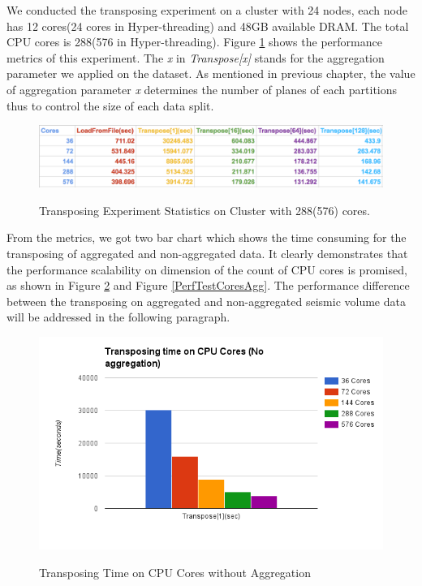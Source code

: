 We conducted the transposing experiment on a cluster with 24 nodes, each node has 12 cores(24 cores in Hyper-threading) and 48GB available DRAM. The total CPU cores is 288(576 in Hyper-threading). Figure \ref{TestStat} shows the performance metrics of this experiment. The \emph{x} in \emph{Transpose[x]} stands for the aggregation parameter we applied on the dataset. As mentioned in previous chapter, the value of aggregation parameter \emph{x} determines the number of planes of each partitions thus to control the size of each data split. 

\begin{figure}[h]
\centering
\includegraphics[scale=0.6]{figures/TestStat.png}\\
\caption{Transposing Experiment Statistics on Cluster with 288(576) cores.}\label{TestStat}
\end{figure}

From the metrics, we got two bar chart which shows the time consuming for the transposing of aggregated and non-aggregated data. It clearly demonstrates that the performance scalability on dimension of the count of CPU cores is promised, as shown in Figure \ref{PerfTestCoresNoAgg} and  Figure \ref{PerfTestCoresAgg}.  The performance difference between the transposing on aggregated and non-aggregated seismic volume data will be addressed in the following paragraph.

\begin{figure}[ht]
\centering
\includegraphics[scale=0.7]{figures/PerfTestCoresNoAgg.png}\\
\caption{Transposing Time on CPU Cores without Aggregation}\label{PerfTestCoresNoAgg}
\end{figure}

